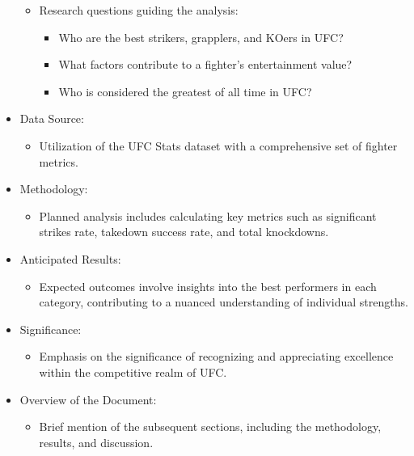 \documentclass[
  man,floatsintext]{apa6}
\providecommand{\tightlist}{%
  \setlength{\itemsep}{0pt}\setlength{\parskip}{0pt}}
\begin{document}
\begin{itemize}
  \begin{itemize}
  \tightlist
  \item
    Research questions guiding the analysis:

    \begin{itemize}
    \tightlist
    \item
      Who are the best strikers, grapplers, and KOers in UFC?
    \item
      What factors contribute to a fighter's entertainment value?
    \item
      Who is considered the greatest of all time in UFC?
    \end{itemize}
  \end{itemize}
\item
  Data Source:

  \begin{itemize}
  \tightlist
  \item
    Utilization of the UFC Stats dataset with a comprehensive set of fighter metrics.
  \end{itemize}
\item
  Methodology:

  \begin{itemize}
  \tightlist
  \item
    Planned analysis includes calculating key metrics such as significant strikes rate, takedown success rate, and total knockdowns.
  \end{itemize}
\item
  Anticipated Results:

  \begin{itemize}
  \tightlist
  \item
    Expected outcomes involve insights into the best performers in each category, contributing to a nuanced understanding of individual strengths.
  \end{itemize}
\item
  Significance:

  \begin{itemize}
  \tightlist
  \item
    Emphasis on the significance of recognizing and appreciating excellence within the competitive realm of UFC.
  \end{itemize}
\item
  Overview of the Document:

  \begin{itemize}
  \tightlist
  \item
    Brief mention of the subsequent sections, including the methodology, results, and discussion.
  \end{itemize}
\end{itemize}
\end{document}
